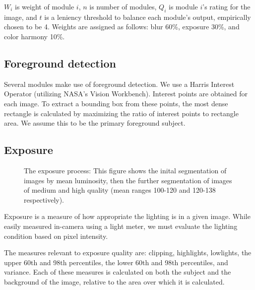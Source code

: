 \documentclass{article}
\begin{document}
\(W_i\) is weight of module \(i\), \(n\) is number of modules, \(Q_i\) is  module \(i\)'s rating for the image, and \(t\) is a leniency threshold to balance each module's output, empirically chosen to be 4. Weights are assigned as follows: blur 60\%, exposure 30\%, and color harmony 10\%.

\subsection{Foreground detection}\label{ContentRecognition}
Several modules make use of foreground detection. We use a Harris Interest Operator (utilizing NASA's Vision Workbench\cite{vision-workbench}). Interest points are obtained for each image. To extract a bounding box from these points, the most dense rectangle is calculated by maximizing the ratio of interest points to rectangle area. We assume this to be the primary foreground subject.


\subsection{Exposure}
\begin{figure}
  \centering
    \caption{The exposure process: This figure shows the inital segmentation of images by mean luminosity, then the further segmentation of images of medium and high quality (mean ranges 100-120 and 120-138 respectively).}
    \label{exposurefigure}
\end{figure}
Exposure is a measure of how appropriate the lighting is in a given image. While easily measured in-camera using a light meter, we must evaluate the lighting condition based on pixel intensity.%

The measures relevant to exposure quality are: clipping, highlights, lowlights, the upper 60th and 98th percentiles, the lower 60th and 98th percentiles, and variance. Each of these measures is calculated on both the subject and the background of the image, relative to the area over which it is calculated.
\end{document}
